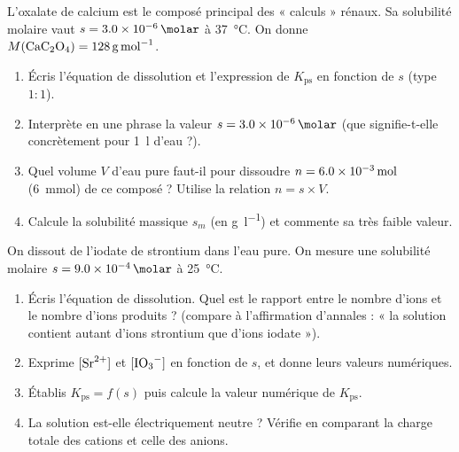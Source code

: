 \documentclass[11pt,a4paper]{article}
\newcommand{\Kps}{K_{\mathrm{ps}}}
\begin{document}
\begin{exercice}
L'oxalate de calcium  est le composé principal des « calculs » rénaux. Sa solubilité molaire
vaut $s=\qty{3{,}0e-6}{\molar}$ à \qty{37}{\degreeCelsius}. On donne $M(\ce{CaC2O4})=\qty{128}{\gram\per\mole}$.
\begin{enumerate}[label=\textbf{\alph*)},leftmargin=2.2em,topsep=2pt,itemsep=2pt]
  \item Écris l'équation de dissolution et l'expression de $\Kps$ en fonction de $s$ (type $1{:}1$).
  \item Interprète en une phrase la valeur $s=\qty{3{,}0e-6}{\molar}$ (que signifie-t-elle
        concrètement pour \qty{1}{\litre} d'eau ?).
  \item Quel volume $V$ d'eau pure faut-il pour dissoudre $n=\qty{6{,}0e-3}{\mole}$ (\qty{6}{mmol})
        de ce composé ? Utilise la relation $n=s\times V$.
  \item Calcule la solubilité massique $s_m$ (en \si{\gram\per\litre}) et commente sa très faible valeur.
\end{enumerate}
\end{exercice}

\begin{exercice}
On dissout de l'iodate de strontium  dans l'eau pure. On mesure une solubilité molaire
$s=\qty{9{,}0e-4}{\molar}$ à \qty{25}{\degreeCelsius}.
\begin{enumerate}[label=\textbf{\alph*)},leftmargin=2.2em,topsep=2pt,itemsep=2pt]
  \item Écris l'équation de dissolution. Quel est le rapport entre le nombre d'ions  et le
        nombre d'ions  produits ? (compare à l'affirmation d'annales : « la solution contient
        autant d'ions strontium que d'ions iodate »).
  \item Exprime $[\ce{Sr^2+}]$ et $[\ce{IO3-}]$ en fonction de $s$, et donne leurs valeurs numériques.
  \item Établis $\Kps=f(s)$ puis calcule la valeur numérique de $\Kps$.
  \item La solution est-elle électriquement neutre ? Vérifie en comparant la charge totale des cations
        et celle des anions.
\end{enumerate}
\end{exercice}
\end{document}
